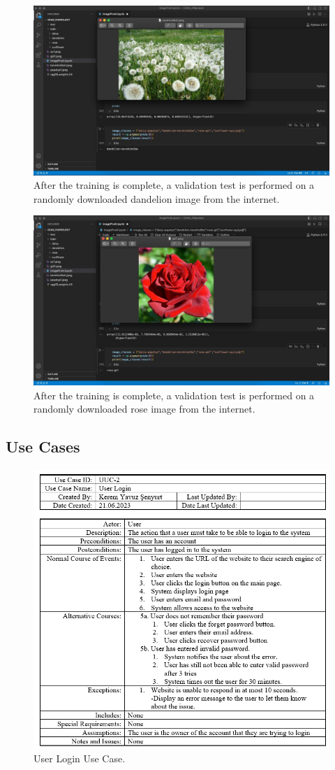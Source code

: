 \documentclass[conference]{IEEEtran}
\begin{document}
\begin{figure}[H]
\centerline{\includegraphics[width=0.48 \textwidth]{images/ai4.jpg}}
\caption{After the training is complete, a validation test is performed on a randomly downloaded dandelion image from the internet.}
\label{fig:graph4}
\end{figure}

\begin{figure}[H]
\centerline{\includegraphics[width=0.48 \textwidth]{images/ai5.jpg}}
\caption{After the training is complete, a validation test is performed on a randomly downloaded rose image from the internet.}
\label{fig:graph5}
\end{figure}


\subsection{Use Cases}

\begin{figure}[H]
\centerline{\includegraphics[width=0.48 \textwidth]{images/UserLoginUseCse.png}}
\caption{User Login Use Case.}
\label{fig:graph5}
\end{figure}
\end{document}
